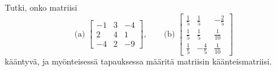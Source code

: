 \documentclass[11pt,a4paper]{amsart}
\begin{document}
\begin{exercise}
  Tutki, onko matriisi
  \[
    \text{(a)}\;
    \begin{bmatrix}
      -1 & 3 & -4 \\
      2 & 4 & 1 \\
      -4 & 2 & -9
    \end{bmatrix},
    \qquad
    \text{(b)}\;
    \begin{bmatrix}
      \frac15 & \frac15 & -\frac25 \\
      \frac15 & \frac15 & \frac1{10} \\
      \frac15 & -\frac45 & \frac1{10}
    \end{bmatrix}
  \]
  kääntyvä, ja myönteisessä tapauksessa määritä matriisin käänteismatriisi.
\end{exercise}
\end{document}
